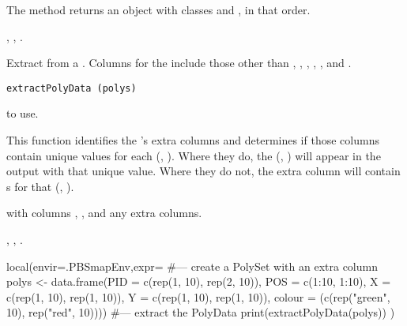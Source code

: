 \documentclass[letterpaper]{book}
\begin{document}
%
\begin{Value}
The  method returns an object with classes
 and , in that order.
\end{Value}
%
\begin{SeeAlso}\relax
{},
,
.
\end{SeeAlso}
%
\begin{Description}\relax
Extract  from a .  Columns for the
 include those other than , ,
, , , and .
\end{Description}
%
\begin{Usage}
\begin{verbatim}
extractPolyData (polys)
\end{verbatim}
\end{Usage}
%
\begin{Arguments}
\begin{ldescription}
\item[\code{polys}]  to use.
\end{ldescription}
\end{Arguments}
%
\begin{Details}\relax
This function identifies the 's extra columns and
determines if those columns contain unique values for each
(, ).  Where they do, the (, )
will appear in the  output with that unique value.
Where they do not, the extra column will contain s for that
(, ).
\end{Details}
%
\begin{Value}
 with columns , , and any extra
columns.
\end{Value}
%
\begin{SeeAlso}\relax
{},
,
.
\end{SeeAlso}
%
\begin{Examples}
\begin{ExampleCode}
local(envir=.PBSmapEnv,expr={
  #--- create a PolySet with an extra column
  polys <- data.frame(PID = c(rep(1, 10), rep(2, 10)),
    POS = c(1:10, 1:10),
    X = c(rep(1, 10), rep(1, 10)),
    Y = c(rep(1, 10), rep(1, 10)),
    colour = (c(rep("green", 10), rep("red", 10))))
  #--- extract the PolyData
  print(extractPolyData(polys))
})
\end{ExampleCode}
\end{Examples}
\end{document}
